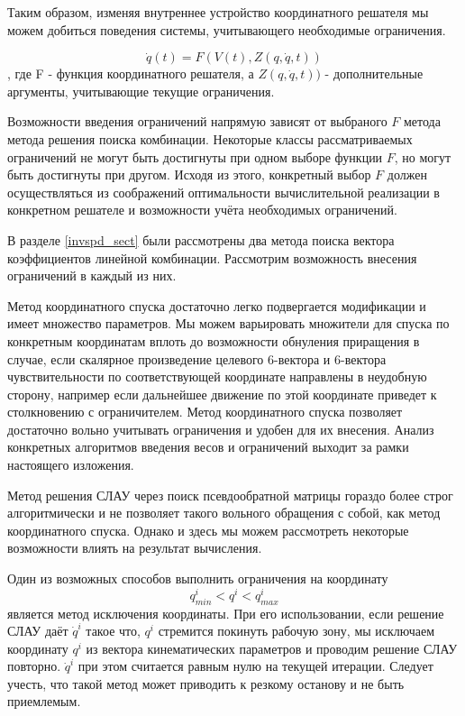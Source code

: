 \documentclass[12pt,a4paper,titlepage]{article}
\begin{document}
Таким образом, изменяя внутреннее устройство координатного решателя мы можем добиться поведения системы, учитывающего необходимые ограничения.

\begin{equation}
\dot{q}(t) = F(V(t), Z(q,\dot{q},t)) 
\end{equation}, где F - функция координатного решателя, а $Z(q,\dot{q},t))$ - дополнительные аргументы, учитывающие текущие ограничения.   

Возможности введения ограничений напрямую зависят от выбраного $F$ метода метода решения поиска комбинации. Некоторые классы рассматриваемых ограничений не могут быть достигнуты при одном выборе функции $F$, но могут быть достигнуты при другом. Исходя из этого, конкретный выбор $F$ должен осуществляться из соображений оптимальности вычислительной реализации в конкретном решателе и возможности учёта необходимых ограничений.

В разделе \ref{invspd_sect} были рассмотрены два метода поиска вектора коэффициентов линейной комбинации. Рассмотрим возможность внесения ограничений в каждый из них.

Метод координатного спуска достаточно легко подвергается модификации и имеет множество параметров. Мы можем варьировать множители для спуска по конкретным координатам вплоть до возможности обнуления приращения в случае, если скалярное произведение целевого 6-вектора и 6-вектора чувствительности по соответствующей координате направлены в неудобную сторону, например если дальнейшее движение по этой координате приведет к столкновению с ограничителем. Метод координатного спуска позволяет достаточно вольно учитывать ограничения и удобен для их внесения. Анализ конкретных алгоритмов введения весов и ограничений выходит за рамки настоящего изложения. 

Метод решения СЛАУ через поиск псевдообратной матрицы гораздо более строг алгоритмически и не позволяет такого вольного обращения с собой, как метод координатного спуска. Однако и здесь мы можем рассмотреть некоторые возможности влиять на результат вычисления.

Один из возможных способов выполнить ограничения на координату
\begin{equation}
q^i_{min} < q^i < q^i_{max} 
\end{equation} является метод исключения координаты. При его использовании, если решение СЛАУ даёт $\dot{q}^i$ такое что, $q^i$ стремится покинуть рабочую зону, мы исключаем координату $q^i$ из вектора кинематических параметров и проводим решение СЛАУ повторно. $\dot{q}^i$ при этом считается равным нулю на текущей итерации. Следует учесть, что такой метод может приводить к резкому останову и не быть приемлемым.
\end{document}
